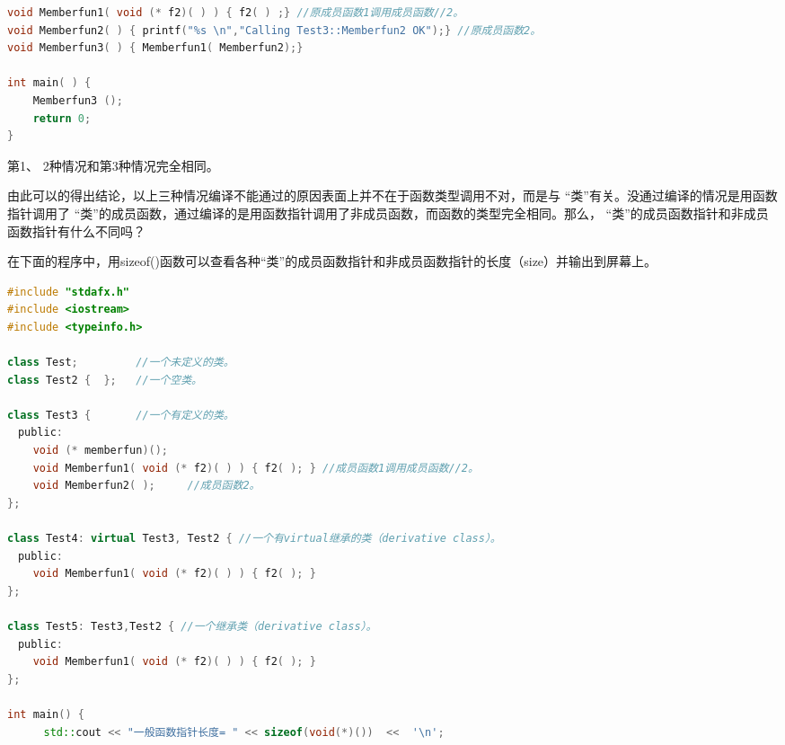 \documentclass{article}
\begin{document}
\begin{CJK}{UTF8}{gbsn}
\begin{itemize}
\begin{lstlisting}[language=c++]
void Memberfun1( void (* f2)( ) ) { f2( ) ;} //原成员函数1调用成员函数//2。  
void Memberfun2( ) { printf("%s \n","Calling Test3::Memberfun2 OK");} //原成员函数2。  
void Memberfun3( ) { Memberfun1( Memberfun2);}  

int main( ) {  
    Memberfun3 ();  
    return 0;  
}
\end{lstlisting}
第1、 2种情况和第3种情况完全相同。

由此可以的得出结论，以上三种情况编译不能通过的原因表面上并不在于函数类型调用不对，而是与 “类”有关。没通过编译的情况是用函数指针调用了 “类”的成员函数，通过编译的是用函数指针调用了非成员函数，而函数的类型完全相同。那么， “类”的成员函数指针和非成员函数指针有什么不同吗？

在下面的程序中，用sizeof()函数可以查看各种“类”的成员函数指针和非成员函数指针的长度（size）并输出到屏幕上。
\begin{lstlisting}[language=c++]
#include "stdafx.h"  
#include <iostream>  
#include <typeinfo.h>

class Test;         //一个未定义的类。  
class Test2 {  };   //一个空类。  

class Test3 {       //一个有定义的类。  
　public:  
    void (* memberfun)();  
    void Memberfun1( void (* f2)( ) ) { f2( ); } //成员函数1调用成员函数//2。  
    void Memberfun2( );     //成员函数2。  
};  

class Test4: virtual Test3, Test2 { //一个有virtual继承的类（derivative class）。  
　public:  
    void Memberfun1( void (* f2)( ) ) { f2( ); }   
};  

class Test5: Test3,Test2 { //一个继承类（derivative class）。  
　public:  
    void Memberfun1( void (* f2)( ) ) { f2( ); }   
};  
 
int main() {  
    　std::cout << "一般函数指针长度= " << sizeof(void(*)())  <<  '\n';  


\end{lstlisting}
\end{itemize}
\end{CJK}
\end{document}
